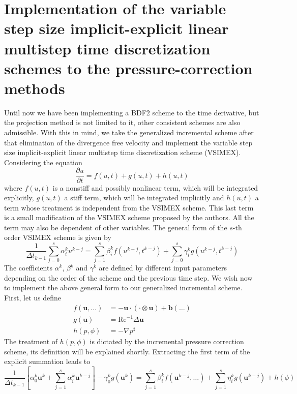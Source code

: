 \documentclass[]{scrartcl}
\newcommand{\pfrac}[2]{\frac{\partial #1}{\partial #2}}
\newcommand{\bs}[1]{\boldsymbol{#1}}
\begin{document}
\section{Implementation of the variable step size implicit-explicit linear multistep time discretization schemes to the pressure-correction methods}
Until now we have been implementing a BDF2 scheme to the time derivative, but the projection method is not limited to it, other consistent schemes are also admissible. With this in mind, we take the generalized incremental scheme after that elimination of the divergence free velocity and implement the variable step size implicit-explicit linear multistep time discretization scheme (VSIMEX). Considering the equation
\begin{equation*}
	\pfrac{u}{t} = f(u, t) + g(u, t) + h(u, t)
\end{equation*}
where $f(u, t)$ is a nonstiff and possibly nonlinear term, which will be integrated explicitly, $g(u,  t)$ a stiff term, which will be integrated implicitly and $h(u, t)$ a term whose treatment is independent from the VSIMEX scheme. This last term is a small modification of the VSIMEX scheme proposed by the authors. All the term may also be dependent of other variables. The general form of the $s$-th order VSIMEX scheme is given by
\begin{equation*}
	\dfrac{1}{\Delta t_{k-1}} \sum_{j=0}^{s} \alpha_i^k u^{k-j} = \sum_{j=1}^{s} \beta_i^k f(u^{k-j}, t^{k-j}) + \sum_{j=0}^{s} \gamma_i^k g(u^{k-j}, t^{k-j})
\end{equation*}
The coefficients $\alpha^k$, $\beta^k$ and $\gamma^k$ are defined by different input parameters depending on the order of the scheme and the previous time step. We wish now to implement the above general form to our generalized incremental scheme. First, let us define
\begin{equation*}
	\begin{aligned}
		f(\bs{u}, \dots) &= -\bs{u} \cdot (\cdot \otimes \bs{u}) + \bs{b}(\dots) \\
		g(\bs{u}) &= \textrm{Re}^{-1} \Delta \bs{u} \\
		h(p, \phi)	 &= -\nabla p^\sharp
	\end{aligned}
\end{equation*}
The treatment of $h(p,\phi)$ is dictated by the incremental pressure correction scheme, its definition will be explained shortly. Extracting the first term of the explicit summation leads to
\begin{equation*}
\dfrac{1}{\Delta t_{k-1}} \left[\alpha_0^k \bs{u}^{k} + \sum_{j=1}^{s} \alpha_i^k \bs{u}^{k-j}\right] - \gamma_0^k g(\bs{u}^{k}) = \sum_{j=1}^{s} \beta_i^k f(\bs{u}^{k-j},\dots) + \sum_{j=1}^{s} \eta_i^k g(\bs{u}^{k-j}) + h(\phi)
\end{equation*}
\end{document}
